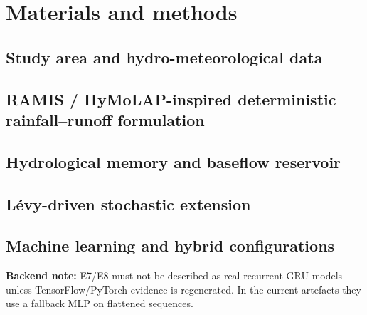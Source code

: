 \documentclass[preprint,12pt]{elsarticle}
\newcommand{\warningbackend}{\textbf{Backend note:} E7/E8 must not be described as real recurrent GRU models unless TensorFlow/PyTorch evidence is regenerated. In the current artefacts they use a fallback MLP on flattened sequences.}
\begin{document}
\section{Materials and methods}

\subsection{Study area and hydro-meteorological data}

\subsection{RAMIS / HyMoLAP-inspired deterministic rainfall--runoff formulation}

\subsection{Hydrological memory and baseflow reservoir}

\subsection{Lévy-driven stochastic extension}

\subsection{Machine learning and hybrid configurations}
\warningbackend
\end{document}
